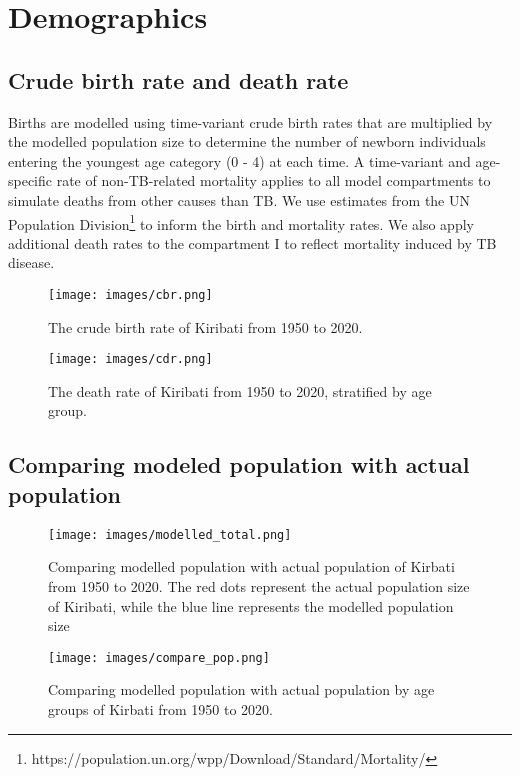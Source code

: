 

\section{Demographics}
\subsection{Crude birth rate and death rate}
Births are modelled using time-variant crude birth rates that are multiplied by the modelled population 
size to determine the number of newborn individuals entering the youngest age category (0 - 4) at each time. A time-variant 
and age-specific rate of non-TB-related mortality applies to all model compartments to simulate 
deaths from other causes than TB. We use estimates from the UN Population Division\footnote{https://population.un.org/wpp/Download/Standard/Mortality/} to inform the 
birth and mortality rates.
We also apply additional death rates to the compartment I to reflect mortality induced by TB 
disease.
\begin{figure}[!ht]
    \texttt{[image: images/cbr.png]}
    \caption{The crude birth rate of Kiribati from 1950 to 2020.}
    \label{fig:cbr}
\end{figure}

\begin{figure}[!ht]
    \texttt{[image: images/cdr.png]}
    \caption{The death rate of Kiribati from 1950 to 2020, stratified by age group.}
    \label{fig:cdr}
\end{figure}

\subsection{Comparing modeled population with actual population}
\begin{figure}[!ht]
    \texttt{[image: images/modelled\_total.png]}
    \caption{Comparing modelled population with actual population of Kirbati from 1950 to 2020. The red dots represent the actual population size of Kiribati,
     while the blue line represents the modelled population size}
    \label{fig:modelled_total}
\end{figure}

\begin{figure}[!ht]
    \texttt{[image: images/compare\_pop.png]}
    \caption{Comparing modelled population with actual population by age groups of Kirbati from 1950 to 2020.}
    \label{fig:compare_group}
\end{figure}